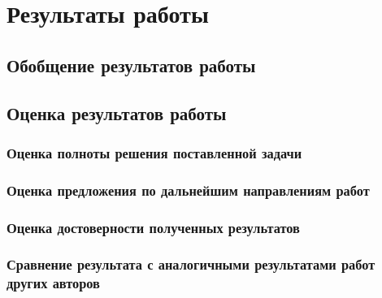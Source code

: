 \chapter{Результаты работы}
\section{Обобщение результатов работы}
\section{Оценка результатов работы}
\subsection{Оценка полноты решения поставленной задачи}
\subsection{Оценка предложения по дальнейшим направлениям работ}
\subsection{Оценка достоверности полученных результатов}
\subsection{Сравнение результата с аналогичными результатами работ других авторов}
